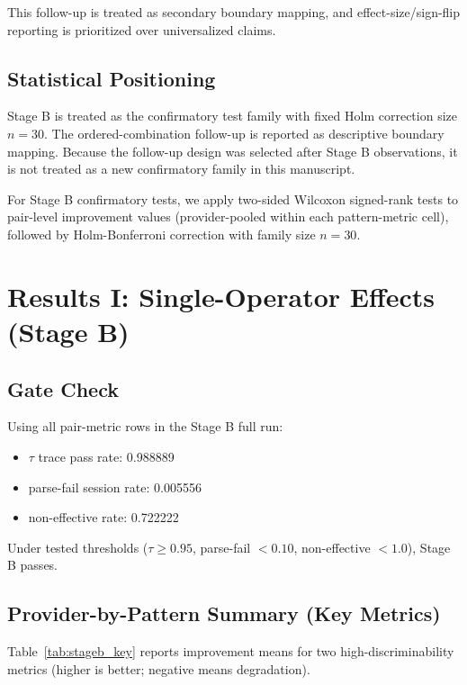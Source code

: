 \documentclass[11pt,a4paper]{article}
\begin{document}
This follow-up is treated as secondary boundary mapping, and effect-size/sign-flip reporting is prioritized over universalized claims.

\subsection{Statistical Positioning}

Stage B is treated as the confirmatory test family with fixed Holm correction size $n=30$. The ordered-combination follow-up is reported as descriptive boundary mapping. Because the follow-up design was selected after Stage B observations, it is not treated as a new confirmatory family in this manuscript.

For Stage B confirmatory tests, we apply two-sided Wilcoxon signed-rank tests to pair-level improvement values (provider-pooled within each pattern-metric cell), followed by Holm-Bonferroni correction with family size $n=30$.

\section{Results I: Single-Operator Effects (Stage B)}
\label{sec:results_stageb}

\subsection{Gate Check}

Using all pair-metric rows in the Stage B full run:
\begin{itemize}
  \item $\tau$ trace pass rate: 0.988889
  \item parse-fail session rate: 0.005556
  \item non-effective rate: 0.722222
\end{itemize}

Under tested thresholds ($\tau\geq0.95$, parse-fail $<0.10$, non-effective $<1.0$), Stage B passes.

\subsection{Provider-by-Pattern Summary (Key Metrics)}

Table~\ref{tab:stageb_key} reports improvement means for two high-discriminability metrics (higher is better; negative means degradation).
\end{document}
